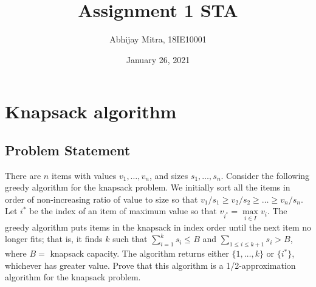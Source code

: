 \documentclass{article}
\title{Assignment 1 STA}
\author{Abhijay Mitra, 18IE10001}
\date{January 26, 2021}
\begin{document}
\maketitle

\section{Knapsack algorithm}
\subsection{Problem Statement}
There are $n$ items with values $v_1,\ldots,v_n$, and sizes $s_1,\ldots,s_n$.
Consider the following greedy algorithm for the knapsack problem.
We initially sort all the items in order of non-increasing ratio of
value to size so that $v_1/s_1 \geq v_2/s_2 \geq \ldots \geq v_n/s_n$.
Let $i^*$ be the index of an item of maximum value so that
$v_{i^*} = \max\limits_{i \in I} v_i$.
The greedy algorithm puts items in the knapsack in index order
until the next item no longer fits;
that is, it finds $k$ such that
$\sum\limits_{i=1}^k s_i \leq B$ and
$\sum\limits_{1 \leq i \leq k+1} s_i > B$, where $B = $ knapsack capacity.
The algorithm returns either $\{1, \ldots, k\}$ or $\{i^*\}$,
whichever has greater value.
Prove that this algorithm is a 1/2-approximation algorithm for the knapsack problem.

\end{document}

